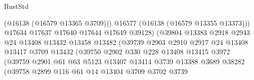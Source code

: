 \begin{lexlean}{RustStd}
\begin{coremodule}
                                          (@16138 (@16579 @13365 @3709)))
                                        @16577
                                        (@16138 (@16579 @13355 @13373)))
                                      @17634
                                      @17637
                                      @17640
                                      @17644
                                      @17649
                                      @39128)
                                    (@39804
                                      @13383
                                      @2918
                                      @2943
                                      @24
                                      @13408
                                      @13432
                                      @13458
                                      @13482
                                      (@39739
                                        @2903
                                        @2910
                                        @2917
                                        @24
                                        @13408
                                        @13417
                                        @3709
                                        @13432
                                        (@39750
                                          @2902
                                          @330
                                          @228
                                          @13408
                                          @13415
                                          @3972
                                          (@39759
                                            @2901
                                            @61
                                            @63
                                            @5123
                                            @13407
                                            @13414
                                            @3739
                                            @13388
                                            @3689
                                            @38282
                                            (@39758
                                              @2899
                                              @116
                                              @61
                                              @14
                                              @13404
                                              @3709
                                              @3702
                                              @3739

\end{coremodule}
\end{lexlean}
